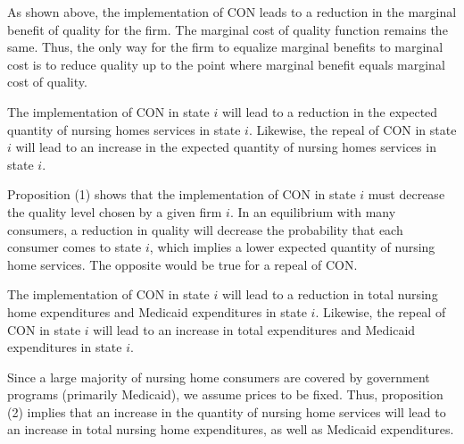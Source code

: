 \documentclass[../Main.tex]{subfiles}
\begin{document}
As shown above, the implementation of CON leads to a reduction in the marginal benefit of quality for the firm. The marginal cost of quality function remains the same. Thus, the only way for the firm to equalize marginal benefits to marginal cost is to reduce quality up to the point where marginal benefit equals marginal cost of quality. 

\begin{Proposition}
The implementation of CON in state $i$ will lead to a reduction in the expected quantity of nursing homes services in state $i$. Likewise, the repeal of CON in state $i$ will lead to an increase in the expected quantity of nursing homes services in state $i$. 
\end{Proposition}

Proposition (1) shows that the implementation of CON in state $i$ must decrease the quality level chosen by a given firm $i$. In an equilibrium with many consumers, a reduction in quality will decrease the probability that each consumer comes to state $i$, which implies a lower expected quantity of nursing home services. The opposite would be true for a repeal of CON. 

\begin{Proposition}
The implementation of CON in state $i$ will lead to a reduction in total nursing home expenditures and Medicaid expenditures in state $i$. Likewise, the repeal of CON in state $i$ will lead to an increase in total expenditures and Medicaid expenditures in state $i$.  
\end{Proposition}

Since a large majority of nursing home consumers are covered by government programs (primarily Medicaid), we assume prices to be fixed. Thus, proposition (2) implies that an increase in the quantity of nursing home services will lead to an increase in total nursing home expenditures, as well as Medicaid expenditures.
\end{document}
